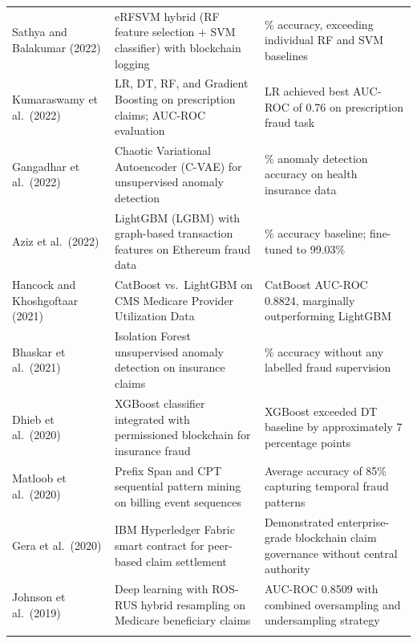 \begin{longtable}{>{\raggedright\arraybackslash}p{3.8cm} >{\raggedright\arraybackslash}p{5.6cm} >{\raggedright\arraybackslash}p{4.8cm}}
Sathya and Balakumar (2022) \cite{sathya2022}
& eRFSVM hybrid (RF feature selection + SVM classifier) with blockchain logging
& 97.176\% accuracy, exceeding individual RF and SVM baselines \\
\addlinespace

Kumaraswamy et al.\ (2022) \cite{kumaraswamy2022}
& LR, DT, RF, and Gradient Boosting on prescription claims; AUC-ROC evaluation
& LR achieved best AUC-ROC of 0.76 on prescription fraud task \\
\addlinespace

Gangadhar et al.\ (2022) \cite{gangadhar2022}
& Chaotic Variational Autoencoder (C-VAE) for unsupervised anomaly detection
& 77.9\% anomaly detection accuracy on health insurance data \\
\addlinespace

Aziz et al.\ (2022) \cite{aziz2022}
& LightGBM (LGBM) with graph-based transaction features on Ethereum fraud data
& 98.60\% accuracy baseline; fine-tuned to 99.03\% \\
\addlinespace

Hancock and Khoshgoftaar (2021) \cite{hancock2021}
& CatBoost vs.\ LightGBM on CMS Medicare Provider Utilization Data
& CatBoost AUC-ROC 0.8824, marginally outperforming LightGBM \\
\addlinespace

Bhaskar et al.\ (2021) \cite{bhaskar2021}
& Isolation Forest unsupervised anomaly detection on insurance claims
& 98.76\% accuracy without any labelled fraud supervision \\
\addlinespace

Dhieb et al.\ (2020) \cite{dhieb2020}
& XGBoost classifier integrated with permissioned blockchain for insurance fraud
& XGBoost exceeded DT baseline by approximately 7 percentage points \\
\addlinespace

Matloob et al.\ (2020) \cite{matloob2020}
& Prefix Span and CPT sequential pattern mining on billing event sequences
& Average accuracy of 85\% capturing temporal fraud patterns \\
\addlinespace

Gera et al.\ (2020) \cite{gera2020}
& IBM Hyperledger Fabric smart contract for peer-based claim settlement
& Demonstrated enterprise-grade blockchain claim governance without central authority \\
\addlinespace

Johnson et al.\ (2019) \cite{johnson2019}
& Deep learning with ROS-RUS hybrid resampling on Medicare beneficiary claims
& AUC-ROC 0.8509 with combined oversampling and undersampling strategy \\
\addlinespace


\end{longtable}
